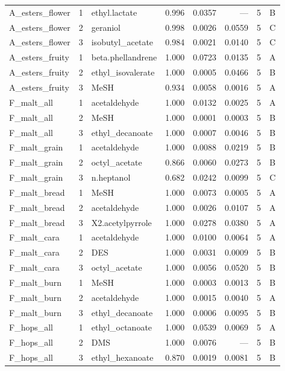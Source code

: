 \begin{longtable}{@{}p{} r p{} r r r r c@{}}
A\_esters\_flower & 1 & ethyl.\allowbreak{}lactate & 0.996 & 0.0357 & --- & 5 & B \\
A\_esters\_flower & 2 & geraniol & 0.998 & 0.0026 & 0.0559 & 5 & C \\
A\_esters\_flower & 3 & isobutyl\_acetate & 0.984 & 0.0021 & 0.0140 & 5 & C \\
A\_esters\_fruity & 1 & beta.\allowbreak{}phellandrene & 1.000 & 0.0723 & 0.0135 & 5 & A \\
A\_esters\_fruity & 2 & ethyl\_isovalerate & 1.000 & 0.0005 & 0.0466 & 5 & B \\
A\_esters\_fruity & 3 & MeSH & 0.934 & 0.0058 & 0.0016 & 5 & A \\
F\_malt\_all & 1 & acetaldehyde & 1.000 & 0.0132 & 0.0025 & 5 & A \\
F\_malt\_all & 2 & MeSH & 1.000 & 0.0001 & 0.0003 & 5 & B \\
F\_malt\_all & 3 & ethyl\_decanoate & 1.000 & 0.0007 & 0.0046 & 5 & B \\
F\_malt\_grain & 1 & acetaldehyde & 1.000 & 0.0088 & 0.0219 & 5 & B \\
F\_malt\_grain & 2 & octyl\_acetate & 0.866 & 0.0060 & 0.0273 & 5 & B \\
F\_malt\_grain & 3 & n.\allowbreak{}heptanol & 0.682 & 0.0242 & 0.0099 & 5 & C \\
F\_malt\_bread & 1 & MeSH & 1.000 & 0.0073 & 0.0005 & 5 & A \\
F\_malt\_bread & 2 & acetaldehyde & 1.000 & 0.0026 & 0.0107 & 5 & A \\
F\_malt\_bread & 3 & X2.\allowbreak{}acetylpyrrole & 1.000 & 0.0278 & 0.0380 & 5 & A \\
F\_malt\_cara & 1 & acetaldehyde & 1.000 & 0.0100 & 0.0064 & 5 & A \\
F\_malt\_cara & 2 & DES & 1.000 & 0.0031 & 0.0009 & 5 & B \\
F\_malt\_cara & 3 & octyl\_acetate & 1.000 & 0.0056 & 0.0520 & 5 & B \\
F\_malt\_burn & 1 & MeSH & 1.000 & 0.0003 & 0.0013 & 5 & B \\
F\_malt\_burn & 2 & acetaldehyde & 1.000 & 0.0015 & 0.0040 & 5 & A \\
F\_malt\_burn & 3 & ethyl\_decanoate & 1.000 & 0.0006 & 0.0095 & 5 & B \\
F\_hops\_all & 1 & ethyl\_octanoate & 1.000 & 0.0539 & 0.0069 & 5 & A \\
F\_hops\_all & 2 & DMS & 1.000 & 0.0076 & --- & 5 & B \\
F\_hops\_all & 3 & ethyl\_hexanoate & 0.870 & 0.0019 & 0.0081 & 5 & B \\

\end{longtable}
